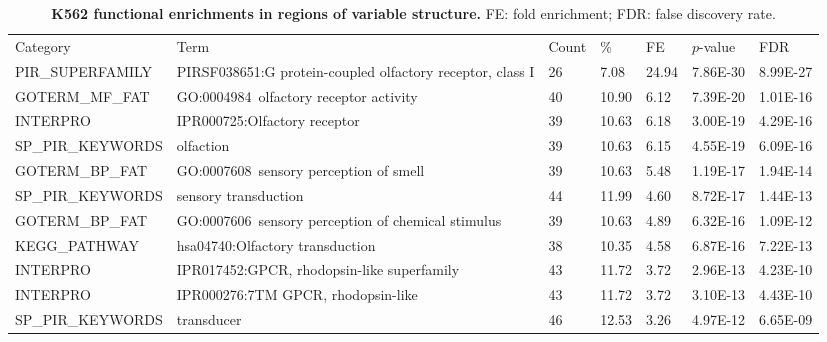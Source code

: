 \documentclass[a4paper,11pt,oneside]{book}
\begin{document}
\clearpage

{\scriptsize 
\begin{longtable}{lllllll}
\caption[K562 functional enrichments in regions of variable structure.]{
{\bf K562 functional enrichments in regions of variable structure. }
FE: fold enrichment; FDR: false discovery rate.
}\label{tab:k5go}\\
\endfirsthead

Category          & Term
& Count & \%    & FE & $p$-value   & FDR      \\
PIR\_SUPERFAMILY  & PIRSF038651:G protein-coupled olfactory receptor, class I       & 26    & 7.08  & 24.94           & 7.86E-30 & 8.99E-27 \\
GOTERM\_MF\_FAT   & GO:0004984~olfactory receptor activity                          & 40    & 10.90 & 6.12            & 7.39E-20 & 1.01E-16 \\
INTERPRO          & IPR000725:Olfactory receptor                                    & 39    & 10.63 & 6.18            & 3.00E-19 & 4.29E-16 \\
SP\_PIR\_KEYWORDS & olfaction                                                       & 39    & 10.63 & 6.15            & 4.55E-19 & 6.09E-16 \\
GOTERM\_BP\_FAT   & GO:0007608~sensory perception of smell                          & 39    & 10.63 & 5.48            & 1.19E-17 & 1.94E-14 \\
SP\_PIR\_KEYWORDS & sensory transduction                                            & 44    & 11.99 & 4.60            & 8.72E-17 & 1.44E-13 \\
GOTERM\_BP\_FAT   & GO:0007606~sensory perception of chemical stimulus              & 39    & 10.63 & 4.89            & 6.32E-16 & 1.09E-12 \\
KEGG\_PATHWAY     & hsa04740:Olfactory transduction                                 & 38    & 10.35 & 4.58            & 6.87E-16 & 7.22E-13 \\
INTERPRO          & IPR017452:GPCR, rhodopsin-like superfamily                      & 43    & 11.72 & 3.72            & 2.96E-13 & 4.23E-10 \\
INTERPRO          & IPR000276:7TM GPCR, rhodopsin-like                              & 43    & 11.72 & 3.72            & 3.10E-13 & 4.43E-10 \\
SP\_PIR\_KEYWORDS & transducer                                                      & 46    & 12.53 & 3.26            & 4.97E-12 & 6.65E-09 \\

\end{longtable}}
\end{document}
